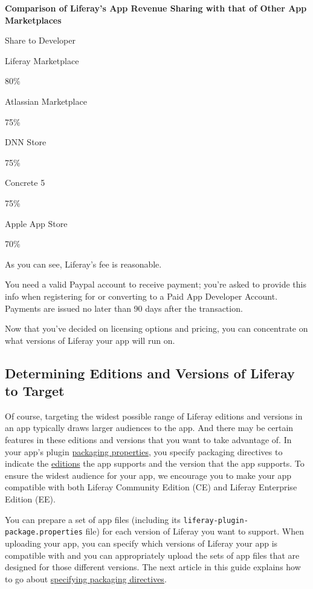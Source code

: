 \textbf{Comparison of Liferay's App Revenue Sharing with that of Other
App Marketplaces}

Share to Developer

Liferay Marketplace

80\%

Atlassian Marketplace

75\%

DNN Store

75\%

Concrete 5

75\%

Apple App Store

70\%

As you can see, Liferay's fee is reasonable.

You need a valid Paypal account to receive payment; you're asked to
provide this info when registering for or converting to a Paid App
Developer Account. Payments are issued no later than 90 days after the
transaction.

Now that you've decided on licensing options and pricing, you can
concentrate on what versions of Liferay your app will run on.

\subsection{Determining Editions and Versions of Liferay to
Target}\label{determining-editions-and-versions-of-liferay-to-target}

Of course, targeting the widest possible range of Liferay editions and
versions in an app typically draws larger audiences to the app. And
there may be certain features in these editions and versions that you
want to take advantage of. In your app's plugin
\href{/distribute/how-to-publish/-/knowledge_base/how-to-publish/preparing-your-app\#specifying-packaging-directives}{packaging
properties}, you specify packaging directives to indicate the
\href{/docs/6-2/deploy/-/knowledge_base/d/editions-of-liferay}{editions}
the app supports and the version that the app supports. To ensure the
widest audience for your app, we encourage you to make your app
compatible with both Liferay Community Edition (CE) and Liferay
Enterprise Edition (EE).

You can prepare a set of app files (including its
\texttt{liferay-plugin-package.properties} file) for each version of
Liferay you want to support. When uploading your app, you can specify
which versions of Liferay your app is compatible with and you can
appropriately upload the sets of app files that are designed for those
different versions. The next article in this guide explains how to go
about
\href{/distribute/how-to-publish/-/knowledge_base/how-to-publish/preparing-your-app\#specifying-packaging-directives}{specifying
packaging directives}.

